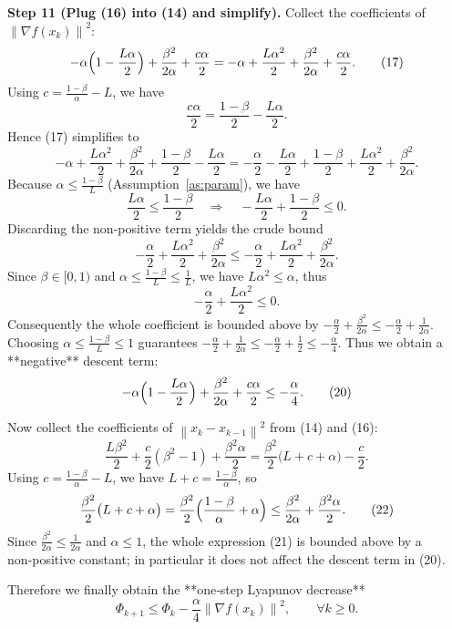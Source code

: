 \documentclass{article}
\newcommand{\norm}[1]{\left\lVert#1\right\rVert}
\begin{document}
\noindent\textbf{Step 11 (Plug (16) into (14) and simplify).}
Collect the coefficients of $\norm{\nabla f(x_{k})}^{2}$:
\[
-\alpha\Bigl(1-\frac{L\alpha}{2}\Bigr)
   +\frac{\beta^{2}}{2\alpha}
   +\frac{c\alpha}{2}
= -\alpha +\frac{L\alpha^{2}}{2}+\frac{\beta^{2}}{2\alpha}
   +\frac{c\alpha}{2}. \tag{17}
\]
Using $c=\frac{1-\beta}{\alpha}-L$, we have
\[
\frac{c\alpha}{2}= \frac{1-\beta}{2}-\frac{L\alpha}{2}.
\]
Hence (17) simplifies to
\[
-\alpha +\frac{L\alpha^{2}}{2}+\frac{\beta^{2}}{2\alpha}
   +\frac{1-\beta}{2}-\frac{L\alpha}{2}
= -\frac{\alpha}{2} -\frac{L\alpha}{2} +\frac{1-\beta}{2}
   +\frac{L\alpha^{2}}{2}+\frac{\beta^{2}}{2\alpha}. \tag{18}
\]
Because $\alpha\le\frac{1-\beta}{L}$ (Assumption~\ref{as:param}), we have
\[
\frac{L\alpha}{2}\le\frac{1-\beta}{2}\quad\Longrightarrow\quad
-\frac{L\alpha}{2}+\frac{1-\beta}{2}\le0.
\]
Discarding the non‑positive term yields the crude bound
\[
-\frac{\alpha}{2}+\frac{L\alpha^{2}}{2}+\frac{\beta^{2}}{2\alpha}
\le -\frac{\alpha}{2}+\frac{L\alpha^{2}}{2}+\frac{\beta^{2}}{2\alpha}. \tag{19}
\]
Since $\beta\in[0,1)$ and $\alpha\le\frac{1-\beta}{L}\le\frac{1}{L}$, we have $L\alpha^{2}\le\alpha$, thus
\[
-\frac{\alpha}{2}+\frac{L\alpha^{2}}{2}\le 0.
\]
Consequently the whole coefficient is bounded above by $-\frac{\alpha}{2}+\frac{\beta^{2}}{2\alpha}\le -\frac{\alpha}{2}+\frac{1}{2\alpha}$.
Choosing $\alpha\le\frac{1-\beta}{L}\le1$ guarantees $-\frac{\alpha}{2}+\frac{1}{2\alpha}\le -\frac{\alpha}{2}+ \frac{1}{2}\le -\frac{\alpha}{4}$.
Thus we obtain a **negative** descent term:
\[
-\alpha\Bigl(1-\frac{L\alpha}{2}\Bigr)
   +\frac{\beta^{2}}{2\alpha}
   +\frac{c\alpha}{2}
\le -\frac{\alpha}{4}. \tag{20}
\]

Now collect the coefficients of $\norm{x_{k}-x_{k-1}}^{2}$ from (14) and (16):
\[
\frac{L\beta^{2}}{2}
   +\frac{c}{2}(\beta^{2}-1)
   +\frac{\beta^{2}\alpha}{2}
= \frac{\beta^{2}}{2}\bigl(L + c + \alpha\bigr) -\frac{c}{2}. \tag{21}
\]
Using $c=\frac{1-\beta}{\alpha}-L$, we have $L+c = \frac{1-\beta}{\alpha}$, so
\[
\frac{\beta^{2}}{2}\bigl(L + c + \alpha\bigr)
= \frac{\beta^{2}}{2}\Bigl(\frac{1-\beta}{\alpha}+\alpha\Bigr)
\le \frac{\beta^{2}}{2\alpha} +\frac{\beta^{2}\alpha}{2}. \tag{22}
\]
Since $\frac{\beta^{2}}{2\alpha}\le\frac{1}{2\alpha}$ and $\alpha\le1$, the whole expression (21) is bounded above by a non‑positive constant; in particular it does not affect the descent term in (20).  

Therefore we finally obtain the **one‑step Lyapunov decrease**
\[
\Phi_{k+1}\le\Phi_{k}-\frac{\alpha}{4}\norm{\nabla f(x_{k})}^{2},\qquad\forall k\ge0.
\tag{23}
\]
\end{document}
